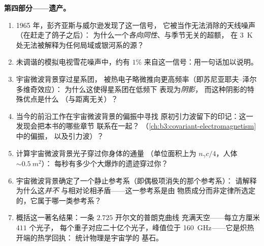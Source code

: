 \begin{problem}
\medskip\noindent\textbf{第四部分——遗产。}
\begin{enumerate}[resume]
  \item 1965 年，彭齐亚斯与威尔逊发现了这一信号，
        它被当作无法消除的天线噪声（在赶走了鸽子之后）：
        为什么一个\emph{各向同性}、与季节无关的超额，
        在 \qty{3}{K} 处无法被解释为任何局域或银河系的源？
  \item 未调谐的模拟电视雪花噪声中，约有 $1\%$
        来自这一信号：用一句话加以说明。
  \item 宇宙微波背景穿过星系团，
        被热电子略微推向更高频率（即苏尼亚耶夫–泽尔多维奇效应）：
        为什么这使得星系团在低频下
        表现为\emph{阴影}，
        而这种阴影的特殊优点是什么
        （与距离无关）？
  \item 当今的前沿工作在宇宙微波背景的偏振中寻找
        原初引力波留下的印记：这一发现会把本书的哪些章节
        联系在一起？
        （\cref{ch:b3:covariant-electromagnetism}中的偏振，
        以及引力波）？
  \item 计算宇宙微波背景光子穿过你身体的通量
        （单位面积上为 $n_\gamma c/4$，人体
        $\sim\qty{0.5}{m^2}$）：
        每秒有多少个大爆炸的遗迹穿过你？
  \item 宇宙微波背景确定了一个静止参考系（即偶极项消失的那个参考系）：
        请解释为什么这\emph{并不}
        与相对论相矛盾——这一参考系是由
        物质成分而非定律所选定的，它属于哪一类参考系？
  \item 概括这一著名结果：一条 $2.725$ 开尔文的普朗克曲线
        充满天空——每立方厘米 $411$ 个光子，
        每个重子对应二十亿个光子，峰值位于
        \qty{160}{GHz}——它是炽热开端的热学回执：
        统计物理是宇宙学的
        基石。
\end{enumerate}
\end{problem}
